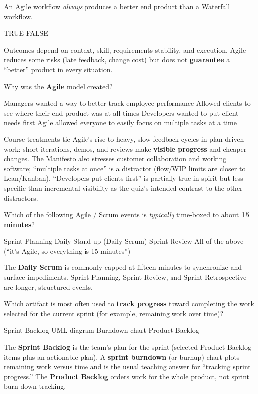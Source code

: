 \question[4]
An Agile workflow \emph{always} produces a better end product than a Waterfall workflow.
\begin{choices}
  \choice TRUE
  \CorrectChoice FALSE
\end{choices}
\begin{solution}
  Outcomes depend on context, skill, requirements stability, and execution. Agile reduces some risks (late feedback, change cost) but does not \textbf{guarantee} a ``better'' product in every situation.
\end{solution}

\question[4]
Why was the \textbf{Agile} model created?
\begin{choices}
  \choice Managers wanted a way to better track employee performance
  \CorrectChoice Allowed clients to see where their end product was at all times
  \choice Developers wanted to put client needs first
  \choice Agile allowed everyone to easily focus on multiple tasks at a time
\end{choices}
\begin{solution}
  Course treatments tie Agile's rise to heavy, slow feedback cycles in plan-driven work: short iterations, demos, and reviews make \textbf{visible progress} and cheaper changes. The Manifesto also stresses customer collaboration and working software; ``multiple tasks at once'' is a distractor (flow/WIP limits are closer to Lean/Kanban). ``Developers put clients first'' is partially true in spirit but less specific than incremental visibility as the quiz's intended contrast to the other distractors.
\end{solution}

\question[4]
Which of the following Agile / Scrum events is \emph{typically} time-boxed to about \textbf{15 minutes}?
\begin{choices}
  \choice Sprint Planning
  \CorrectChoice Daily Stand-up (Daily Scrum)
  \choice Sprint Review
  \choice All of the above (``it's Agile, so everything is 15 minutes'')
\end{choices}
\begin{solution}
  The \textbf{Daily Scrum} is commonly capped at fifteen minutes to synchronize and surface impediments. Sprint Planning, Sprint Review, and Sprint Retrospective are longer, structured events.
\end{solution}

\question[4]
Which artifact is most often used to \textbf{track progress} toward completing the work selected for the current sprint (for example, remaining work over time)?
\begin{choices}
  \choice Sprint Backlog
  \choice UML diagram
  \CorrectChoice Burndown chart
  \choice Product Backlog
\end{choices}
\begin{solution}
  The \textbf{Sprint Backlog} is the team's plan for the sprint (selected Product Backlog items plus an actionable plan). A \textbf{sprint burndown} (or burnup) chart plots remaining work versus time and is the usual teaching answer for ``tracking sprint progress.'' The \textbf{Product Backlog} orders work for the whole product, not sprint burn-down tracking.
\end{solution}

